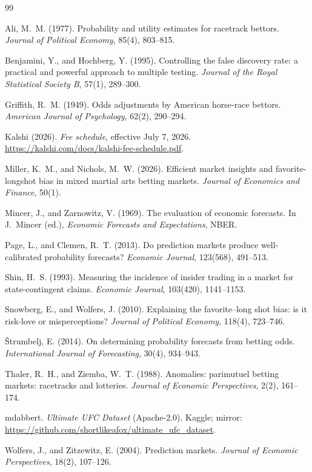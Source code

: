 \documentclass[11pt]{article}
\begin{document}
\begin{thebibliography}{99}

Ali, M.~M. (1977). Probability and utility estimates for racetrack bettors.
\emph{Journal of Political Economy}, 85(4), 803--815.

Benjamini, Y., and Hochberg, Y. (1995). Controlling the false discovery rate: a practical and
powerful approach to multiple testing. \emph{Journal of the Royal Statistical Society B}, 57(1),
289--300.

Griffith, R.~M. (1949). Odds adjustments by American horse-race bettors.
\emph{American Journal of Psychology}, 62(2), 290--294.

Kalshi (2026). \emph{Fee schedule}, effective July 7, 2026.
\url{https://kalshi.com/docs/kalshi-fee-schedule.pdf}.

Miller, K.~M., and Nichols, M.~W. (2026). Efficient market insights and favorite-longshot bias
in mixed martial arts betting markets. \emph{Journal of Economics and Finance}, 50(1).

Mincer, J., and Zarnowitz, V. (1969). The evaluation of economic forecasts. In J.~Mincer (ed.),
\emph{Economic Forecasts and Expectations}, NBER.

Page, L., and Clemen, R.~T. (2013). Do prediction markets produce well-calibrated probability
forecasts? \emph{Economic Journal}, 123(568), 491--513.

Shin, H.~S. (1993). Measuring the incidence of insider trading in a market for state-contingent
claims. \emph{Economic Journal}, 103(420), 1141--1153.

Snowberg, E., and Wolfers, J. (2010). Explaining the favorite--long shot bias: is it risk-love or
misperceptions? \emph{Journal of Political Economy}, 118(4), 723--746.

\v{S}trumbelj, E. (2014). On determining probability forecasts from betting odds.
\emph{International Journal of Forecasting}, 30(4), 934--943.

Thaler, R.~H., and Ziemba, W.~T. (1988). Anomalies: parimutuel betting markets: racetracks and
lotteries. \emph{Journal of Economic Perspectives}, 2(2), 161--174.

mdabbert. \emph{Ultimate UFC Dataset} (Apache-2.0). Kaggle;
mirror: \url{https://github.com/shortlikeafox/ultimate_ufc_dataset}.

Wolfers, J., and Zitzewitz, E. (2004). Prediction markets.
\emph{Journal of Economic Perspectives}, 18(2), 107--126.

\end{thebibliography}
\end{document}

